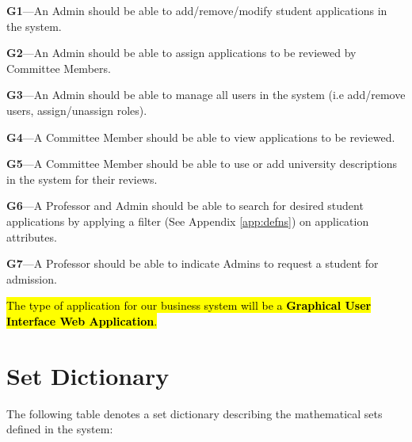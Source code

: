 \documentclass[fontsize=12pt,paper=letter,twoside]{scrartcl}
\begin{document}
\begin{mylist}

\item \textbf{G1}---An Admin should be able to add/remove/modify student applications in the system.

\item \textbf{G2}---An Admin should be able to assign applications to be reviewed by Committee Members.

\item \textbf{G3}---An Admin should be able to manage all users in the system (i.e add/remove users, assign/unassign roles).

\item \textbf{G4}---A Committee Member should be able to view applications to be reviewed.

\item \textbf{G5}---A Committee Member should be able to use or add university descriptions in the system for their reviews.

\item \textbf{G6}---A Professor and Admin should be able to search for desired student applications by applying a filter (See Appendix \ref{app:defns}) on application attributes.

\item \textbf{G7}---A Professor should be able to indicate Admins to request a student for admission.
\end{mylist}

\smallskip
\noindent \hl{The type of application for our business system will be a \textbf{Graphical User Interface Web Application}.} 


\newpage
\section{Set Dictionary}

The following table denotes a set dictionary describing the mathematical sets defined in the system:
\end{document}
